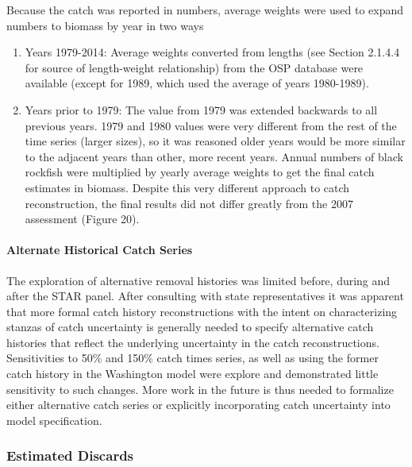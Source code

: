 \documentclass[11pt,
  english,
  letterpaper,
]{article}
\providecommand{\tightlist}{%
  \setlength{\itemsep}{0pt}\setlength{\parskip}{0pt}}
\providecommand{\tightlist}{%
  \setlength{\itemsep}{0pt}\setlength{\parskip}{0pt}}
\begin{document}
Because the catch was reported in numbers, average weights were used to expand numbers to biomass by year in two ways

\begin{enumerate}
\def\labelenumi{\arabic{enumi}.}
\tightlist
\item
  Years 1979-2014: Average weights converted from lengths (see Section 2.1.4.4 for source of length-weight relationship) from the OSP database were available (except for 1989, which used the average of years 1980-1989).
\item
  Years prior to 1979: The value from 1979 was extended backwards to all previous years. 1979 and 1980 values were very different from the rest of the time series (larger sizes), so it was reasoned older years would be more similar to the adjacent years than other, more recent years. Annual numbers of black rockfish were multiplied by yearly average weights to get the final catch estimates in biomass. Despite this very different approach to catch reconstruction, the final results did not differ greatly from the 2007 assessment (Figure 20).
\end{enumerate}

\hypertarget{alternate-historical-catch-series}{%
\paragraph{Alternate Historical Catch Series}\label{alternate-historical-catch-series}}

The exploration of alternative removal histories was limited before, during and after the STAR panel. After consulting with state representatives it was apparent that more formal catch history reconstructions with the intent on characterizing stanzas of catch uncertainty is generally needed to specify alternative catch histories that reflect the underlying uncertainty in the catch reconstructions. Sensitivities to 50\% and 150\% catch times series, as well as using the former catch history in the Washington model were explore and demonstrated little sensitivity to such changes. More work in the future is thus needed to formalize either alternative catch series or explicitly incorporating catch uncertainty into model specification.

\hypertarget{estimated-discards}{%
\subsubsection{Estimated Discards}\label{estimated-discards}}
\end{document}
